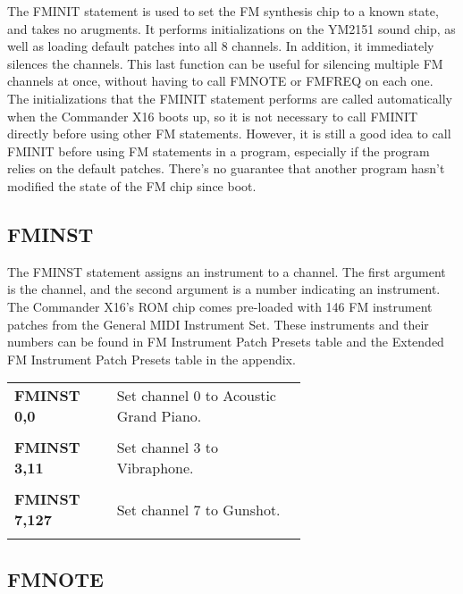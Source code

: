 The {\ttfamily FMINIT} statement is used to set the FM synthesis chip to a
known state, and takes no arugments.  It performs initializations on the YM2151
sound chip, as well as loading default patches into all 8 channels.  In
addition, it immediately silences the channels.  This last function can be
useful for silencing multiple FM channels at once, without having to call
{\ttfamily FMNOTE} or {\ttfamily FMFREQ} on each one.  The initializations that
the {\ttfamily FMINIT} statement performs are called automatically when the
Commander X16 boots up, so it is not necessary to call {\ttfamily FMINIT}
directly before using other FM statements.  However, it is still a good idea to
call {\ttfamily FMINIT} before using FM statements in a program, especially if
the program relies on the default patches.  There's no guarantee that another
program hasn't modified the state of the FM chip since boot.\\

\subsection{FMINST}

The {\ttfamily FMINST} statement assigns an instrument to a channel.  The first
argument is the channel, and the second argument is a number indicating an
instrument.  The Commander X16's ROM chip comes pre-loaded with 146 FM
instrument patches from the General MIDI Instrument Set.  These instruments and
their numbers can be found in FM Instrument Patch Presets table and the
Extended FM Instrument Patch Presets table in the appendix.\\

\begin{tabular}{l p{0.65\linewidth}}

	{\ttfamily\bfseries FMINST 0,0}&Set channel 0 to Acoustic Grand Piano.\\\\

	{\ttfamily\bfseries FMINST 3,11}&Set channel 3 to Vibraphone.\\\\

	{\ttfamily\bfseries FMINST 7,127}&Set channel 7 to Gunshot.\\\\

\end{tabular}

\subsection{FMNOTE}

